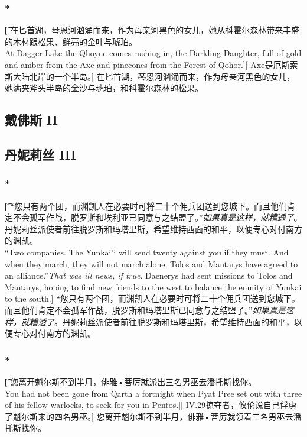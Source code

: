 \documentclass[12pt,a4paper]{article}
\begin{document}
\subsubsection{\color{red}*}\t[
	在匕首湖，琴恩河汹涌而来，作为母亲河黑色的女儿，她从科霍尔森林带来丰盛的木材跟松果、鲜亮的金叶与琥珀。\\
	At Dagger Lake the Qhoyne comes rushing in, the Darkling Daughter, full of gold and amber from the Axe and pinecones from the Forest of Qohor.][
	Axe是厄斯索斯大陆北岸的一个半岛。]
	在匕首湖，琴恩河汹涌而来，作为母亲河黑色的女儿，她满夹斧头半岛的金沙与琥珀，和科霍尔森林的松果。
	
	
\subsection{戴佛斯 II}

\subsection{丹妮莉丝 III}
\subsubsection{\color{red}*}\t[
	“您只有两个团，而渊凯人在必要时可将二十个佣兵团送到您城下。而且他们肯定不会孤军作战，脱罗斯和埃利亚已同意与之结盟了。”\emph{如果真是这样，就糟透了}。丹妮莉丝派使者前往脱罗斯和玛塔里斯，希望维持西面的和平，以便专心对付南方的渊凯。\\
	“Two companies. The Yunkai'i will send twenty against you if they must. And when they march, they will not march alone. Tolos and Mantarys have agreed to an alliance.”\emph{That was ill news, if true}. Daenerys had sent missions to Tolos and Mantarys, hoping to find new friends to the west to balance the enmity of Yunkai to the south.]
	“您只有两个团，而渊凯人在必要时可将二十个佣兵团送到您城下。而且他们肯定不会孤军作战，脱罗斯和玛塔里斯已同意与之结盟了。”\emph{如果真是这样，就糟透了}。丹妮莉丝派使者前往脱罗斯和玛塔里斯，希望维持西面的和平，以便专心对付南方的渊凯。
	
\subsubsection{\color{red}*}\t[
	您离开魁尔斯不到半月，俳雅•菩厉就派出三名男巫去潘托斯找你。\\
	You had not been gone from Qarth a fortnight when Pyat Pree set out with three of his fellow warlocks, to seek for you in Pentos.][
	IV.29掠夺者，攸伦说自己俘虏了魁尔斯来的四名男巫。]
	您离开魁尔斯不到半月，俳雅•菩厉就领着三名男巫去潘托斯找你。
	
\end{document}
